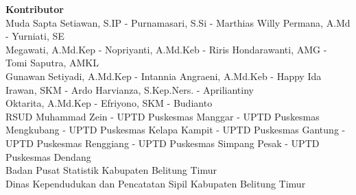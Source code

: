 {\begin{raggedright}
\textbf{Kontributor}\\
\smallskip
Muda Sapta Setiawan, S.IP - Purnamasari, S.Si - Marthias Willy Permana, A.Md - Yurniati, SE\\
\smallskip
Megawati, A.Md.Kep - Nopriyanti, A.Md.Keb - Riris Hondarawanti, AMG - Tomi Saputra, AMKL \\
\smallskip
Gunawan Setiyadi, A.Md.Kep - Intannia Angraeni, A.Md.Keb - Happy Ida Irawan, SKM - Ardo Harvianza, S.Kep.Ners. - Apriliantiny\\
\smallskip
Oktarita, A.Md.Kep - Efriyono, SKM - Budianto\\
\smallskip
RSUD Muhammad Zein - UPTD Puskesmas Manggar - UPTD Puskesmas Mengkubang
- UPTD Puskesmas Kelapa Kampit - UPTD Puskesmas Gantung - UPTD Puskesmas
Renggiang - UPTD Puskesmas Simpang Pesak - UPTD Puskesmas Dendang \\
\smallskip
Badan Pusat Statistik Kabupaten Belitung Timur\\
\smallskip
Dinas Kependudukan dan Pencatatan Sipil Kabupaten Belitung Timur
\end{raggedright}

}